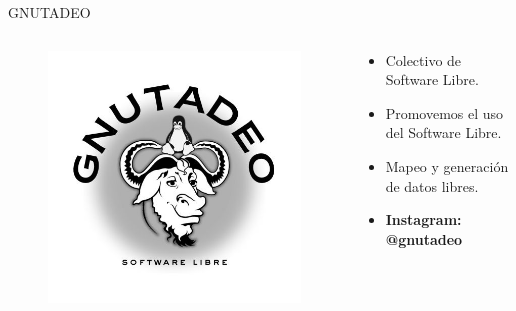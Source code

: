 \documentclass{beamer}
\begin{document}
\begin{frame}{GNUTADEO}

  \begin{columns}
    \begin{column}{.5\textwidth}
      \begin{figure}
        \centering
        \includegraphics[width=\textwidth]{img/gnutadeo.jpg}
      \end{figure}
    \end{column}

    \begin{column}{.5\textwidth}
      \begin{itemize}
      \item Colectivo de Software Libre.
      \item Promovemos el uso del Software Libre.
      \item Mapeo y generación de datos libres.
      \item \textbf{Instagram: @gnutadeo}
      \end{itemize}

    \end{column}
  \end{columns}


\end{frame}
\end{document}
